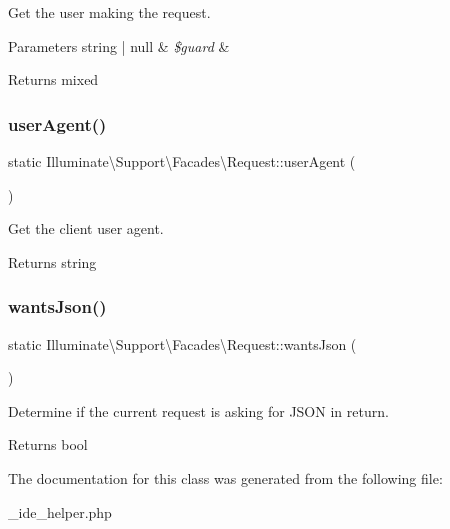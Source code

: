 Get the user making the request.


\begin{DoxyParams}[1]{Parameters}
string | null & {\em \$guard} & \\
\hline
\end{DoxyParams}
\begin{DoxyReturn}{Returns}
mixed 
\end{DoxyReturn}
\mbox{\label{class_illuminate_1_1_support_1_1_facades_1_1_request_a3a185583cec2b7eefae89f509cb4f3ab}} 
\subsubsection{\texorpdfstring{user\+Agent()}{userAgent()}}
{\footnotesize\ttfamily static Illuminate\textbackslash{}\+Support\textbackslash{}\+Facades\textbackslash{}\+Request\+::user\+Agent (\begin{DoxyParamCaption}{ }\end{DoxyParamCaption})\hspace{0.3cm}{\ttfamily [static]}}

Get the client user agent.

\begin{DoxyReturn}{Returns}
string 
\end{DoxyReturn}
\mbox{\label{class_illuminate_1_1_support_1_1_facades_1_1_request_a427ab22e9702aeee550d669594ea7c03}} 
\subsubsection{\texorpdfstring{wants\+Json()}{wantsJson()}}
{\footnotesize\ttfamily static Illuminate\textbackslash{}\+Support\textbackslash{}\+Facades\textbackslash{}\+Request\+::wants\+Json (\begin{DoxyParamCaption}{ }\end{DoxyParamCaption})\hspace{0.3cm}{\ttfamily [static]}}

Determine if the current request is asking for J\+S\+ON in return.

\begin{DoxyReturn}{Returns}
bool 
\end{DoxyReturn}


The documentation for this class was generated from the following file\+:\begin{DoxyCompactItemize}
\item 
\+\_\+ide\+\_\+helper.\+php\end{DoxyCompactItemize}
